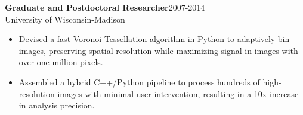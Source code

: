\documentclass[11pt]{res}
\begin{document}
\begin{resume}
{\bf Graduate and Postdoctoral Researcher}\hfill\mbox{2007-2014}\\
University of Wisconsin-Madison
                  \vspace* {0.01 in}\begin{itemize} \itemsep -2pt
                    \item Devised a fast Voronoi Tessellation
                      algorithm in Python
                      to adaptively bin images, preserving spatial
                      resolution while maximizing signal in images
                      with over one million pixels.
                   \item Assembled a hybrid C++/Python
                     pipeline to process hundreds of high-resolution images with
                     minimal user intervention, resulting in a 10x increase in analysis precision.
                  \end{itemize} 
\vspace{-0.1in}

\end{resume}
\end{document}
